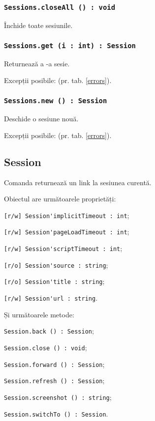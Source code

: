 \subsubsection{\lstinline|Sessions.closeAll () : void|}

Închide toate sesiunile.

\subsubsection{\lstinline|Sessions.get (i : int) : Session|}

Returnează a -a sesie.

Excepții posibile:  (pr. tab. \ref{errors}).

\subsubsection{\lstinline|Sessions.new () : Session|}

Deschide o sesiune nouă.

Excepții posibile:  (pr. tab. \ref{errors}).

\subsection{{\color{orange} Session}}

Comanda \session{} returnează un link la sesiunea curentă.

Obiectul \session{} are următoarele proprietăți:
\begin{icItems}
	\item \lstinline|[r/w] Session'implicitTimeout : int|;
	\item \lstinline|[r/w] Session'pageLoadTimeout : int|;
	\item \lstinline|[r/w] Session'scriptTimeout : int|;
	\item \lstinline|[r/o] Session'source : string|;
	\item \lstinline|[r/o] Session'title : string|;
	\item \lstinline|[r/w] Session'url : string|.
\end{icItems}

Și următoarele metode:
\begin{icItems}
	\item \lstinline|Session.back () : Session|;
	\item \lstinline|Session.close () : void|;
	\item \lstinline|Session.forward () : Session|;
	\item \lstinline|Session.refresh () : Session|;
	\item \lstinline|Session.screenshot () : string|;
	\item \lstinline|Session.switchTo () : Session|.
\end{icItems}


